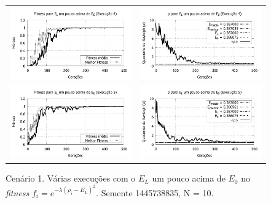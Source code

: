 \begin{figure}[p]
\begin{tabular}{@{}cc@{}}
		\includegraphics[width=.40\textwidth]{figs/resultados/variandoEL/T1E4_fitness.pdf} &
    \includegraphics[width=.40\textwidth]{figs/resultados/variandoEL/T1E4_rho.pdf}   \\
		
		\includegraphics[width=.40\textwidth]{figs/resultados/variandoEL/T1E5_fitness.pdf} &
    \includegraphics[width=.40\textwidth]{figs/resultados/variandoEL/T1E5_rho.pdf}		
  \end{tabular}
  \caption{Cenário 1. Várias execuções com o $E_L$ um pouco acima de $E_0$ no \textit{fitness} $f_i = e^{-\lambda(\rho_i - E_L)^2}$. Semente 1445738835, N = 10.}
	\label{fig:variando_EL_pouco_acima}
	\end{figure}
	
